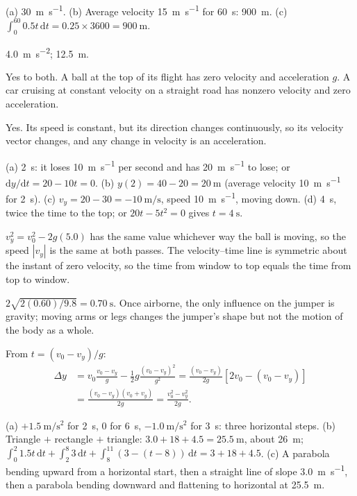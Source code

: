 \documentclass[11pt,twoside,openany]{book}
\newcommand{\dd}{\mathrm{d}}
\begin{document}
\begin{description}[leftmargin=2.6em,itemsep=3pt,style=sameline]
  \item[2.44] (a) \SI{30}{\metre\per\second}. (b) Average velocity \SI{15}{\metre\per\second} for \SI{60}{\second}: \SI{900}{\metre}. (c) $\int_0^{60} 0.5t\,\dd t = 0.25 \times 3600 = \SI{900}{\metre}$.
  \item[2.45] \SI{4.0}{\metre\per\second\squared}; \SI{12.5}{\metre}.
  \item[2.46] Yes to both. A ball at the top of its flight has zero velocity and acceleration $g$. A car cruising at constant velocity on a straight road has nonzero velocity and zero acceleration.
  \item[2.47] Yes. Its speed is constant, but its direction changes continuously, so its velocity vector changes, and any change in velocity is an acceleration.
  \item[2.48] (a) \SI{2}{\second}: it loses \SI{10}{\metre\per\second} per second and has \SI{20}{\metre\per\second} to lose; or $\dd y/\dd t = 20 - 10t = 0$. (b) $y(2) = 40 - 20 = \SI{20}{\metre}$ (average velocity \SI{10}{\metre\per\second} for \SI{2}{\second}). (c) $v_y = 20 - 30 = \SI{-10}{\metre\per\second}$, speed \SI{10}{\metre\per\second}, moving down. (d) \SI{4}{\second}, twice the time to the top; or $20t - 5t^2 = 0$ gives $t = \SI{4}{\second}$.
  \item[2.49] $v_y^2 = v_0^2 - 2g(5.0)$ has the same value whichever way the ball is moving, so the speed $|v_y|$ is the same at both passes. The velocity--time line is symmetric about the instant of zero velocity, so the time from window to top equals the time from top to window.
  \item[2.50] $2\sqrt{2(0.60)/9.8} = \SI{0.70}{\second}$. Once airborne, the only influence on the jumper is gravity; moving arms or legs changes the jumper's shape but not the motion of the body as a whole.
  \item[2.51] From $t = (v_0 - v_y)/g$:
  \begin{align*}
  \Delta y &= v_0\frac{v_0 - v_y}{g} - \tfrac12 g\frac{(v_0 - v_y)^2}{g^2} = \frac{(v_0 - v_y)}{2g}\left[2v_0 - (v_0 - v_y)\right] \\
  &= \frac{(v_0 - v_y)(v_0 + v_y)}{2g} = \frac{v_0^2 - v_y^2}{2g}.
  \end{align*}
  \item[2.52] (a) $+\SI{1.5}{\metre\per\second\squared}$ for \SI{2}{\second}, $0$ for \SI{6}{\second}, $\SI{-1.0}{\metre\per\second\squared}$ for \SI{3}{\second}: three horizontal steps. (b) Triangle $+$ rectangle $+$ triangle: $3.0 + 18 + 4.5 = \SI{25.5}{\metre}$, about \SI{26}{\metre}; $\int_0^2 1.5t\,\dd t + \int_2^8 3\,\dd t + \int_8^{11} (3 - (t - 8))\,\dd t = 3 + 18 + 4.5$. (c) A parabola bending upward from a horizontal start, then a straight line of slope \SI{3.0}{\metre\per\second}, then a parabola bending downward and flattening to horizontal at \SI{25.5}{\metre}.

\end{description}
\end{document}
